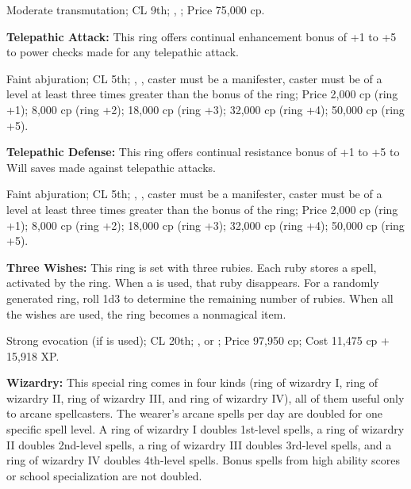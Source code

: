 Moderate transmutation; CL 9th; , ; Price 75,000 cp.


\textbf{Telepathic Attack:} This ring offers continual enhancement bonus of +1 to +5 to power checks made for any telepathic attack.

Faint abjuration; CL 5th; , , caster must be a manifester, caster must be of a level at least three times greater than the bonus of the ring; Price 2,000 cp (ring +1); 8,000 cp (ring +2); 18,000 cp (ring +3); 32,000 cp (ring +4); 50,000 cp (ring +5).


\textbf{Telepathic Defense:} This ring offers continual resistance bonus of +1 to +5 to Will saves made against telepathic attacks.

Faint abjuration; CL 5th; , , caster must be a manifester, caster must be of a level at least three times greater than the bonus of the ring; Price 2,000 cp (ring +1); 8,000 cp (ring +2); 18,000 cp (ring +3); 32,000 cp (ring +4); 50,000 cp (ring +5).


\textbf{Three Wishes:} This ring is set with three rubies. Each ruby stores a  spell, activated by the ring. When a  is used, that ruby disappears. For a randomly generated ring, roll 1d3 to determine the remaining number of rubies. When all the wishes are used, the ring becomes a nonmagical item.

Strong evocation (if  is used); CL 20th; ,  or ; Price 97,950 cp; Cost 11,475 cp + 15,918 XP.





\textbf{Wizardry:} This special ring comes in four kinds (ring of wizardry I, ring of wizardry II, ring of wizardry III, and ring of wizardry IV), all of them useful only to arcane spellcasters. The wearer's arcane spells per day are doubled for one specific spell level. A ring of wizardry I doubles 1st-level spells, a ring of wizardry II doubles 2nd-level spells, a ring of wizardry III doubles 3rd-level spells, and a ring of wizardry IV doubles 4th-level spells. Bonus spells from high ability scores or school specialization are not doubled.

